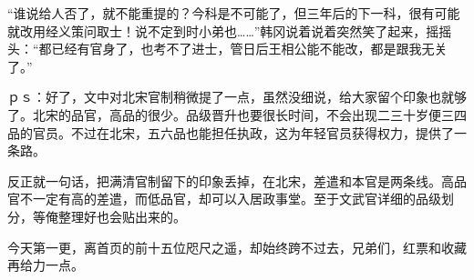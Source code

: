 “谁说给人否了，就不能重提的？今科是不可能了，但三年后的下一科，很有可能就改用经义策问取士！说不定到时小弟也……”韩冈说着说着突然笑了起来，摇摇头：“都已经有官身了，也考不了进士，管日后王相公能不能改，都是跟我无关了。”

ｐｓ：好了，文中对北宋官制稍微提了一点，虽然没细说，给大家留个印象也就够了。北宋的品官，高品的很少。品级晋升也要很长时间，不会出现二三十岁便三四品的官员。不过在北宋，五六品也能担任执政，这为年轻官员获得权力，提供了一条路。

反正就一句话，把满清官制留下的印象丢掉，在北宋，差遣和本官是两条线。高品官不一定有高的差遣，而低品官，却可以入居政事堂。至于文武官详细的品级划分，等俺整理好也会贴出来的。

今天第一更，离首页的前十五位咫尺之遥，却始终跨不过去，兄弟们，红票和收藏再给力一点。

